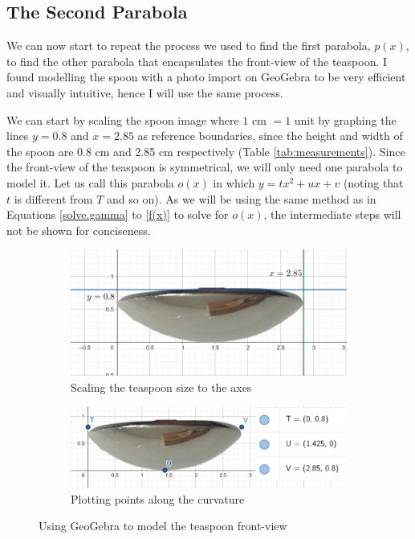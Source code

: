 \documentclass[12pt]{article}
\begin{document}
\subsection{The Second Parabola}
We can now start to repeat the process we used to find the first parabola, $p(x)$, to find the other parabola that encapsulates the front-view of the teaspoon. I found modelling the spoon with a photo import on GeoGebra to be very efficient and visually intuitive, hence I will use the same process.

We can start by scaling the spoon image where $1$ cm $=1$ unit by graphing the lines $y=0.8$ and $x=2.85$ as reference boundaries, since the height and width of the spoon are 0.8 cm and 2.85 cm respectively (Table \ref{tab:measurements}). Since the front-view of the teaspoon is symmetrical, we will only need one parabola to model it. Let us call this parabola $o(x)$ in which $y=tx^2 + ux +v$ (noting that $t$ is different from $T$ and so on). As we will be using the same method as in Equations \ref{solve.gamma} to \ref{f(x)} to solve for $o(x)$, the intermediate steps will not be shown for conciseness.  

\pagebreak

\begin{figure}[h]
     \centering
     \begin{subfigure}[b]{0.45\textwidth}
         \centering
         \includegraphics[width=\textwidth]{images/tsp scale.png}
         \caption{Scaling the teaspoon size to the axes}
         \label{fig:scale}
     \end{subfigure}
     \hfill
     \begin{subfigure}[b]{0.45\textwidth}
         \centering
         \includegraphics[width=\textwidth]{images/tsp points.png}
         \caption{Plotting points along the curvature}
         \label{fig:plot}
     \end{subfigure}
     \hfill
        \caption{Using GeoGebra to model the teaspoon front-view}
        \label{fig:tsp geo2}
\end{figure}
\end{document}
